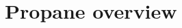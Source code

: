 \documentclass{sig-alternate-10pt}
\newcommand{\todo}[1]{\textcolor{red}{[TODO: #1]}}
\begin{document}
%
%
%
%





%
%
%
%

\section{Propane overview}
\label{sec:propane}
\end{document}
